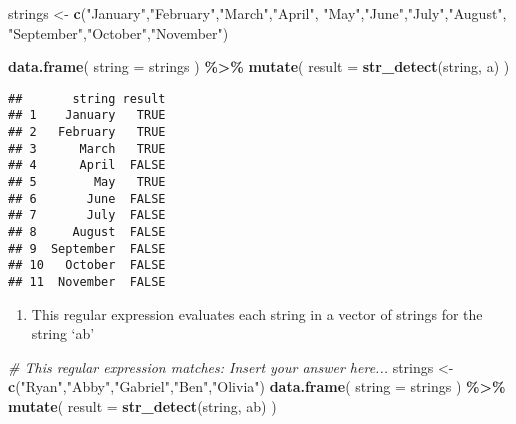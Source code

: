 \documentclass[
]{article}
\newenvironment{Shaded}{\begin{snugshade}}{\end{snugshade}}
\newcommand{\AttributeTok}[1]{\textcolor[rgb]{0.13,0.29,0.53}{#1}}
\newcommand{\CommentTok}[1]{\textcolor[rgb]{0.56,0.35,0.01}{\textit{#1}}}
\newcommand{\FunctionTok}[1]{\textcolor[rgb]{0.13,0.29,0.53}{\textbf{#1}}}
\newcommand{\NormalTok}[1]{#1}
\newcommand{\OtherTok}[1]{\textcolor[rgb]{0.56,0.35,0.01}{#1}}
\newcommand{\SpecialCharTok}[1]{\textcolor[rgb]{0.81,0.36,0.00}{\textbf{#1}}}
\newcommand{\StringTok}[1]{\textcolor[rgb]{0.31,0.60,0.02}{#1}}
\providecommand{\tightlist}{%
  \setlength{\itemsep}{0pt}\setlength{\parskip}{0pt}}
\begin{document}
\begin{Shaded}
\begin{Highlighting}[]
\NormalTok{strings }\OtherTok{\textless{}{-}} \FunctionTok{c}\NormalTok{(}\StringTok{"January"}\NormalTok{,}\StringTok{"February"}\NormalTok{,}\StringTok{"March"}\NormalTok{,}\StringTok{"April"}\NormalTok{,}
            \StringTok{"May"}\NormalTok{,}\StringTok{"June"}\NormalTok{,}\StringTok{"July"}\NormalTok{,}\StringTok{"August"}\NormalTok{,}
            \StringTok{"September"}\NormalTok{,}\StringTok{"October"}\NormalTok{,}\StringTok{"November"}\NormalTok{)}

\FunctionTok{data.frame}\NormalTok{( }\AttributeTok{string =}\NormalTok{ strings ) }\SpecialCharTok{\%\textgreater{}\%}
  \FunctionTok{mutate}\NormalTok{( }\AttributeTok{result =} \FunctionTok{str\_detect}\NormalTok{(string, }\StringTok{\textquotesingle{}a\textquotesingle{}}\NormalTok{) )}
\end{Highlighting}
\end{Shaded}

\begin{verbatim}
##       string result
## 1    January   TRUE
## 2   February   TRUE
## 3      March   TRUE
## 4      April  FALSE
## 5        May   TRUE
## 6       June  FALSE
## 7       July  FALSE
## 8     August  FALSE
## 9  September  FALSE
## 10   October  FALSE
## 11  November  FALSE
\end{verbatim}

\begin{enumerate}
\def\labelenumi{\alph{enumi})}
\setcounter{enumi}{1}
\tightlist
\item
  This regular expression evaluates each string in a vector of strings
  for the string `ab'
\end{enumerate}

\begin{Shaded}
\begin{Highlighting}[]
\CommentTok{\# This regular expression matches:  Insert your answer here...}
\NormalTok{strings }\OtherTok{\textless{}{-}} \FunctionTok{c}\NormalTok{(}\StringTok{"Ryan"}\NormalTok{,}\StringTok{"Abby"}\NormalTok{,}\StringTok{"Gabriel"}\NormalTok{,}\StringTok{"Ben"}\NormalTok{,}\StringTok{"Olivia"}\NormalTok{)}
\FunctionTok{data.frame}\NormalTok{( }\AttributeTok{string =}\NormalTok{ strings ) }\SpecialCharTok{\%\textgreater{}\%}
  \FunctionTok{mutate}\NormalTok{( }\AttributeTok{result =} \FunctionTok{str\_detect}\NormalTok{(string, }\StringTok{\textquotesingle{}ab\textquotesingle{}}\NormalTok{) )}
\end{Highlighting}
\end{Shaded}
\end{document}
